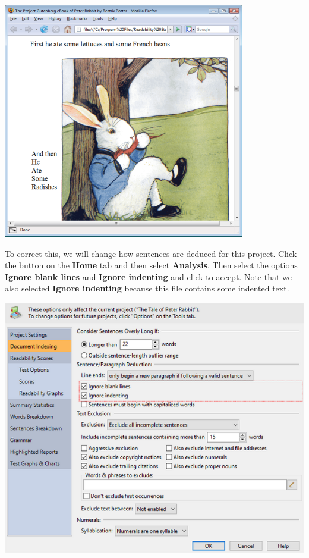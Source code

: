 \documentclass[
]{book}
\theoremstyle{definition}
\theoremstyle{definition}
\theoremstyle{definition}
\theoremstyle{definition}
\theoremstyle{remark}
\begin{document}
\begin{center}\includegraphics[width=0.75\linewidth,]{Images/NonGenerated/PeterRabbitBrowser} \end{center}

To correct this, we will change how sentences are deduced for this project. Click the  button on the \textbf{Home} tab and then select \textbf{Analysis}. Then select the options \textbf{Ignore blank lines} and \textbf{Ignore indenting} and click  to accept. Note that we also selected \textbf{Ignore indenting} because this file contains some indented text.

\includegraphics{Images/IgnoreBlankLines.png}
\end{document}
